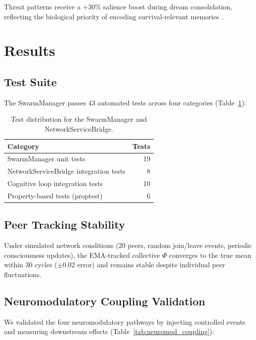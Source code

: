 \documentclass[11pt,a4paper]{article}
\begin{document}
Threat patterns receive a +30\% salience boost during dream consolidation, reflecting the biological priority of encoding survival-relevant memories \citep{walker2017}.

\section{Results}

\subsection{Test Suite}

The SwarmManager passes 43 automated tests across four categories (Table~\ref{tab:swarm_tests}):

\begin{table}[h]
\centering
\caption{Test distribution for the SwarmManager and NetworkServiceBridge.}
\label{tab:swarm_tests}
\begin{tabular}{lr}
\toprule
\textbf{Category} & \textbf{Tests} \\
\midrule
SwarmManager unit tests & 19 \\
NetworkServiceBridge integration tests & 8 \\
Cognitive loop integration tests & 10 \\
Property-based tests (proptest) & 6 \\
\bottomrule
\end{tabular}
\end{table}

\subsection{Peer Tracking Stability}

Under simulated network conditions (20 peers, random join/leave events, periodic consciousness updates), the EMA-tracked collective $\Phi$ converges to the true mean within 30 cycles ($\pm 0.02$ error) and remains stable despite individual peer fluctuations.

\subsection{Neuromodulatory Coupling Validation}

We validated the four neuromodulatory pathways by injecting controlled events and measuring downstream effects (Table~\ref{tab:neuromod_coupling}):
\end{document}
